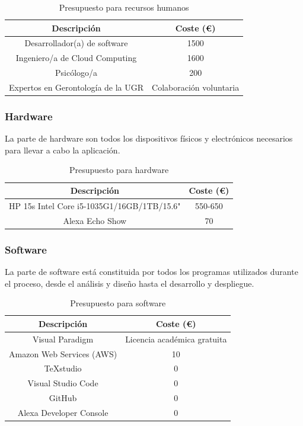 \begin{table}[H]
    \centering
    \begin{tabular}{|c|c|}
    \hline
    \rowcolor{lightgray}
    \textbf{Descripción} & \textbf{Coste (€)}\\
    \hline
    Desarrollador(a) de software & 1500 \\
    \hline
    Ingeniero/a de Cloud Computing & 1600 \\
    \hline
    Psicólogo/a & 200 \\
    \hline
    Expertos en Gerontología de la UGR & Colaboración voluntaria \\
    \hline
    \end{tabular}
    \caption{Presupuesto para recursos humanos}
    \label{tab:presupuesto-personal}
\end{table}

\subsubsection{Hardware}
La parte de hardware son todos los dispositivos físicos y electrónicos necesarios para llevar a cabo la aplicación.

\begin{table}[H]
    \centering
    \begin{tabular}{|c|c|}
    \hline
    \rowcolor{lightgray}
    \textbf{Descripción} & \textbf{Coste (€)}\\
    \hline
    HP 15s Intel Core i5-1035G1/16GB/1TB/15.6" & 550-650 \\
    \hline
    Alexa Echo Show & 70 \\
    \hline
    \end{tabular}
    \caption{Presupuesto para hardware}
    \label{tab:presupuesto-hw}
\end{table}

\subsubsection{Software}
La parte de software está constituida por todos los programas utilizados durante el proceso, desde el análisis y diseño hasta el desarrollo y despliegue.  

\begin{table}[H]
    \centering
    \begin{tabular}{|c|c|}
    \hline
    \rowcolor{lightgray}
    \textbf{Descripción} & \textbf{Coste (€)}\\
    \hline
    Visual Paradigm & Licencia académica gratuita \\
    \hline
    Amazon Web Services (AWS) & 10 \\
    \hline
    TeXstudio & 0 \\
    \hline
    Visual Studio Code & 0 \\
    \hline
    GitHub & 0 \\
    \hline
    Alexa Developer Console & 0 \\
    \hline
    \end{tabular}
    \caption{Presupuesto para software}
    \label{tab:presupuesto-sw}
\end{table}

